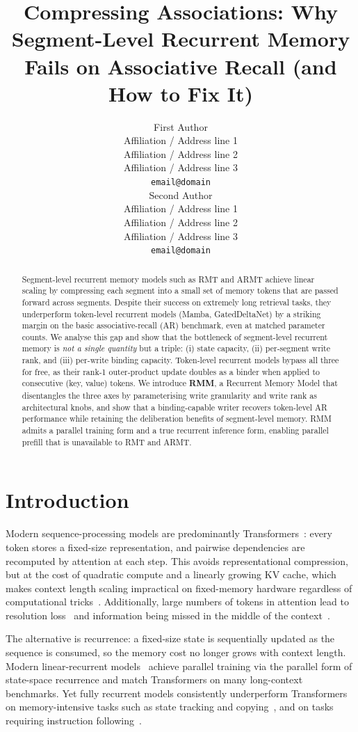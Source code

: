 \documentclass[11pt]{article}
\title{Compressing Associations: Why Segment-Level Recurrent Memory Fails on Associative Recall (and How to Fix It)}
\author{First Author \\
  Affiliation / Address line 1 \\
  Affiliation / Address line 2 \\
  Affiliation / Address line 3 \\
  \texttt{email@domain} \\\And
  Second Author \\
  Affiliation / Address line 1 \\
  Affiliation / Address line 2 \\
  Affiliation / Address line 3 \\
  \texttt{email@domain} \\}
\begin{document}
\maketitle
\begin{abstract}
Segment-level recurrent memory models such as RMT and ARMT achieve linear scaling by compressing each segment into a small set of memory tokens that are passed forward across segments. Despite their success on extremely long retrieval tasks, they underperform token-level recurrent models (Mamba, GatedDeltaNet) by a striking margin on the basic associative-recall (AR) benchmark, even at matched parameter counts. We analyse this gap and show that the bottleneck of segment-level recurrent memory is \emph{not a single quantity} but a triple: (i) state capacity, (ii) per-segment write rank, and (iii) per-write binding capacity. Token-level recurrent models bypass all three for free, as their rank-1 outer-product update doubles as a binder when applied to consecutive (key, value) tokens. We introduce \textbf{RMM}, a Recurrent Memory Model that disentangles the three axes by parameterising write granularity and write rank as architectural knobs, and show that a binding-capable writer recovers token-level AR performance while retaining the deliberation benefits of segment-level memory. RMM admits a parallel training form and a true recurrent inference form, enabling parallel prefill that is unavailable to RMT and ARMT.
\end{abstract}

\section{Introduction}

Modern sequence-processing models are predominantly Transformers~\citep{vaswani2017attention}: every token stores a fixed-size representation, and pairwise dependencies are recomputed by attention at each step. This avoids representational compression, but at the cost of quadratic compute and a linearly growing KV cache, which makes context length scaling impractical on fixed-memory hardware regardless of computational tricks~\citep{flashattention}. Additionally, large numbers of tokens in attention lead to resolution loss~\citep{niah} and information being missed in the middle of the context~\citep{liu2023lost}.

The alternative is recurrence: a fixed-size state is sequentially updated as the sequence is consumed, so the memory cost no longer grows with context length. Modern linear-recurrent models~\citep{gu2021ssm, gu2023mamba, sun2023retnet, yang2024gateddeltanet} achieve parallel training via the parallel form of state-space recurrence and match Transformers on many long-context benchmarks. Yet fully recurrent models consistently underperform Transformers on memory-intensive tasks such as state tracking and copying~\citep{merrill2024statetracking, jelassi2024repeat}, and on tasks requiring instruction following~\citep{park2024canmambalearn}.
\end{document}
